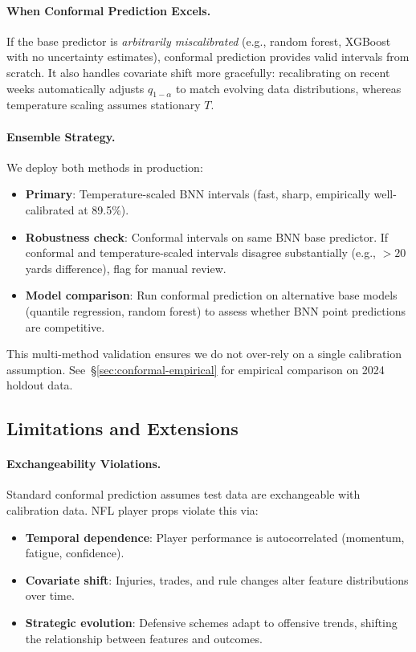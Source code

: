 \paragraph{When Conformal Prediction Excels.}
If the base predictor is \textit{arbitrarily miscalibrated} (e.g., random forest, XGBoost with no uncertainty estimates), conformal prediction provides valid intervals from scratch. It also handles covariate shift more gracefully: recalibrating on recent weeks automatically adjusts $q_{1-\alpha}$ to match evolving data distributions, whereas temperature scaling assumes stationary $T$.

\paragraph{Ensemble Strategy.}
We deploy both methods in production:

\begin{itemize}
    \item \textbf{Primary}: Temperature-scaled BNN intervals (fast, sharp, empirically well-calibrated at 89.5\%).
    \item \textbf{Robustness check}: Conformal intervals on same BNN base predictor. If conformal and temperature-scaled intervals disagree substantially (e.g., $>20$ yards difference), flag for manual review.
    \item \textbf{Model comparison}: Run conformal prediction on alternative base models (quantile regression, random forest) to assess whether BNN point predictions are competitive.
\end{itemize}

This multi-method validation ensures we do not over-rely on a single calibration assumption. See~\S\ref{sec:conformal-empirical} for empirical comparison on 2024 holdout data.

\subsection{Limitations and Extensions}\label{subsec:conformal-limitations}

\paragraph{Exchangeability Violations.}
Standard conformal prediction assumes test data are exchangeable with calibration data. NFL player props violate this via:

\begin{itemize}
    \item \textbf{Temporal dependence}: Player performance is autocorrelated (momentum, fatigue, confidence).
    \item \textbf{Covariate shift}: Injuries, trades, and rule changes alter feature distributions over time.
    \item \textbf{Strategic evolution}: Defensive schemes adapt to offensive trends, shifting the relationship between features and outcomes.
\end{itemize}

